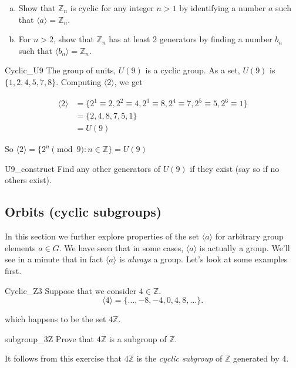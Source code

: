 \begin{exercise}{}
\begin{enumerate}[(a)]
\item
Show that  ${\mathbb Z}_n$ is cyclic for any integer $n > 1$ by identifying a number $a$ such that $\langle a \rangle = {\mathbb Z}_n$.
\item
For $n>2$, show that ${\mathbb Z}_n$ has at least 2 generators by finding a number $b_n$ such that 
$\langle b_n \rangle = {\mathbb Z}_n$.
\end{enumerate}
\end{exercise}

\begin{example}{Cyclic_U9}
The group of units, $U(9)$ is a cyclic group.  As a
set, $U(9)$ is $\{ 1, 2, 4, 5, 7, 8  \}$. Computing $\langle 2 \rangle$, we get 

\begin{align*}
 \langle 2 \rangle &= \{ 2^1 \equiv 2, 2^2 \equiv 4, 2^3 \equiv 8, 2^4 \equiv 7, 2^5 \equiv 5, 2^6 \equiv 1 \} \\
 &= \{2, 4, 8, 7, 5, 1\} \\
 &= U(9)
 \end{align*}

\noindent
So $\langle 2 \rangle = \{ 2^n \pmod{9} : n \in \mathbb Z \} = U(9)$
\end{example}

\begin{exercise}{U9_construct}
Find any other generators of $U(9)$ if they exist (say so if no others exist).
\end{exercise}

\subsection{Orbits (cyclic subgroups)}\label{CyclicSubgroups}
In this section we further explore properties of the set $\langle a \rangle$ for arbitrary group elements $a \in G$. We have seen that in some cases, $\langle a \rangle$ is actually  a group. We'll see in a minute that in fact $\langle a \rangle$ is \emph{always} a group. Let's look at some examples first.

\begin{example}{Cyclic_Z3}
Suppose that we consider $4 \in {\mathbb Z}$. 
\[
\langle 4 \rangle = \{ \ldots,-8, -4, 0, 4, 8, \ldots \}.
\]

\noindent
which happens to be the set $4 {\mathbb Z}$.

\begin{exercise}{subgroup_3Z}
Prove that $4 {\mathbb Z}$ is a subgroup of $\mathbb Z$.
\end{exercise}
It follows from this exercise that $4 {\mathbb Z}$ is the \emph{cyclic subgroup} of $\mathbb Z$ generated by $4$.
\end{example}


